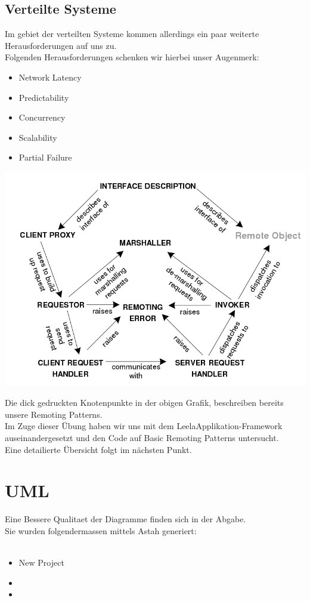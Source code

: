 \documentclass[a4paper]{article}
\begin{document}
\subsection{Verteilte Systeme}
Im gebiet der verteilten Systeme kommen allerdings ein paar weiterte Herausforderungen auf uns zu.\\
Folgenden Herausforderungen schenken wir hierbei unser Augenmerk:
\begin{itemize}
	\item Network Latency
	\item Predictability
	\item Concurrency
	\item Scalability
	\item Partial Failure
\end{itemize}
\begin{center}
	\includegraphics[scale=0.4]{img/remoting_patterns.png}
\end{center}
Die dick gedruckten Knotenpunkte in der obigen Grafik, beschreiben bereits unsere Remoting Patterns.\\
Im Zuge dieser Übung haben wir uns mit dem LeelaApplikation-Framework auseinandergesetzt und den Code auf Basic Remoting Patterns untersucht.\\
Eine detailierte Übersicht folgt im nächsten Punkt.
\cite{RP-WU-Wien}
\newpage
\section{UML}
Eine Bessere Qualitaet der Diagramme finden sich in der Abgabe. \\ Sie wurden folgendermassen mittels Astah generiert: \\ \\
\begin{itemize}
\item New Project 
\item 
\item
\end{itemize}
\end{document}
